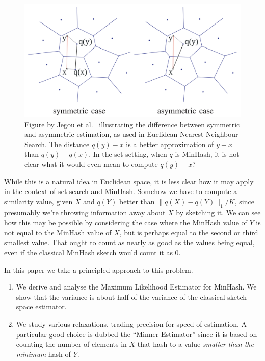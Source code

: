 \begin{figure}[h]
   \centering
   \includegraphics[width=\linewidth]{figures/pq}
\caption{Figure by Jegou et al.~\cite{jegou2010product} illustrating the difference between symmetric and asymmetric estimation, as used in Euclidean Nearest Neighbour Search.
   The distance $q(y)-x$ is a better approximation of $y-x$ than $q(y)-q(x)$.
   In the set setting, when $q$ is MinHash, it is not clear what it would even mean to compute $q(y)-x$?
}
   \label{fig:jegou}
\end{figure}


While this is a natural idea in Euclidean space, it is less clear how it may apply in the context of set search and MinHash.
Somehow we have to compute a similarity value, given $X$ and $q(Y)$ better than $\|q(X)-q(Y)\|_1/K$, since presumably we're throwing information away about $X$ by sketching it.
We can see how this may be possible by considering the case where the MinHash value of $Y$ is not equal to the MinHash value of $X$, but is perhaps equal to the second or third smallest value.
That ought to count as nearly as good as the values being equal, even if the classical MinHash sketch would count it as 0.

In this paper we take a principled approach to this problem.
\begin{enumerate}
   \item We derive and analyse the Maximum Likelihood Estimator for MinHash.
      We show that the variance is about half of the variance of the classical sketch-space estimator.
   \item We study various relaxations, trading precision for speed of estimation.
      A particular good choice is dubbed the ``Minner Estimator'' since it is based on counting the number of elements in $X$ that hash to a value \emph{smaller than the minimum} hash of $Y$.
\end{enumerate}

